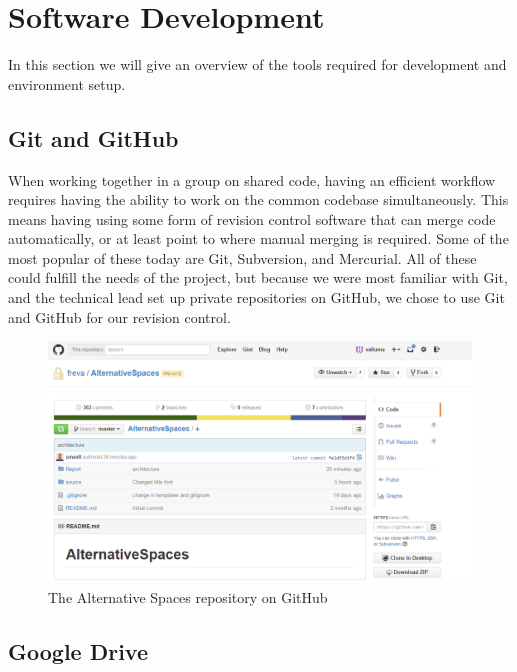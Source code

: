 \section{Software Development}
\label{sec:PlanningSoftwareDev}

In this section we will give an overview of the tools required for development and environment setup.

\subsection{Git and GitHub}
\label{subsec:PlanningSoftwareDevGit}

When working together in a group on shared code, having an efficient workflow requires having the ability to work on the common codebase simultaneously. This means having using some form of revision control software that can merge code automatically, or at least point to where manual merging is required. Some of the most popular of these today are Git, Subversion, and Mercurial. All of these could fulfill the needs of the project, but because we were most familiar with Git, and the technical lead set up private repositories on GitHub, we chose to use Git and GitHub for our revision control.

\begin{figure}[ht!]
  \centering
  \includegraphics[width=\linewidth]{./Planning/img/ASpacesRepo}
  \caption{The Alternative Spaces repository on GitHub}
  \label{fig:PlanningSoftwareDevGitRepo}
\end{figure}

\subsection{Google Drive}
\label{subsec:PlanningSoftwareDevDrive}

